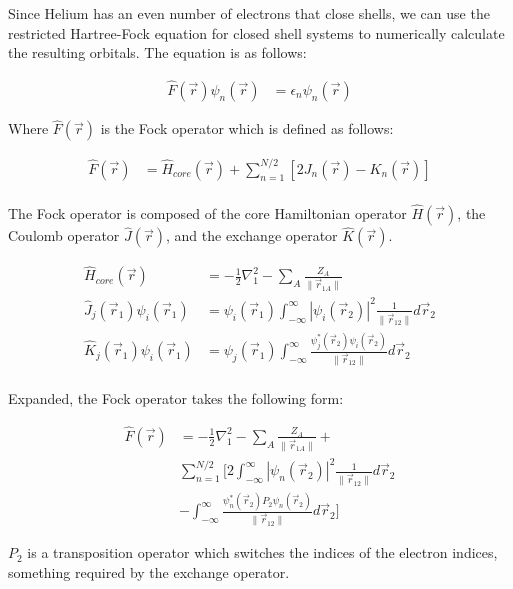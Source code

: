 \documentclass[journal, twoside]{IEEEtran}
\begin{document}
Since Helium has an even number of electrons that close shells, we can use the restricted Hartree-Fock equation for closed shell systems to numerically calculate the resulting orbitals. The equation is as follows:

\begin{align*}
  \hat{F}(\vec{r})\psi_n(\vec{r}) &= \epsilon_n\psi_n(\vec{r})
\end{align*}

Where $\hat{F}(\vec{r})$ is the Fock operator which is defined as follows:

\begin{align*}
  \hat{F}(\vec{r}) &= \hat{H}_{core}(\vec{r}) + \sum_{n=1}^{N/2}\left[2J_n(\vec{r}) - K_n(\vec{r})\right]\\
\end{align*}

The Fock operator is composed of the core Hamiltonian operator $\hat{H}(\vec{r})$, the Coulomb operator $\hat{J}(\vec{r})$, and the exchange operator $\hat{K}(\vec{r})$.

\begin{align*}
  \hat{H}_{core}(\vec{r}) &= -\frac{1}{2}\nabla_1^2 - \sum_A\frac{Z_A}{\|\vec{r}_{1 A}\|}\\
  \hat{J}_j(\vec{r}_1)\psi_i(\vec{r}_1) &= \psi_i(\vec{r}_1)\int_{-\infty}^{\infty}\left|\psi_i(\vec{r}_2)\right|^2\frac{1}{\|\vec{r}_{12}\|}d\vec{r}_2 \\
  \hat{K}_j(\vec{r}_1)\psi_i(\vec{r}_1) &= \psi_j(\vec{r}_1)\int_{-\infty}^{\infty}\frac{\psi_j^\ast(\vec{r}_2)\psi_i(\vec{r}_2)}{\|\vec{r}_{12}\|}d\vec{r}_2 \\
\end{align*}

Expanded, the Fock operator takes the following form:

\begin{align*}
  \hat{F}(\vec{r}) &= -\frac{1}{2}\nabla_1^2 - \sum_A\frac{Z_A}{\|\vec{r}_{1 A}\|} + \\ & \sum_{n=1}^{N/2} \bigg[ 2\int_{-\infty}^{\infty}\left|\psi_n(\vec{r}_2)\right|^2\frac{1}{\|\vec{r}_{12}\|}d\vec{r}_2 \\ & - \int_{-\infty}^{\infty}\frac{\psi_n^\ast(\vec{r}_2)P_2\psi_n(\vec{r}_2)}{\|\vec{r}_{12}\|}d\vec{r}_2 \bigg]
\end{align*}

$P_2$ is a transposition operator which switches the indices of the electron indices, something required by the exchange operator.


\lipsum[1]
\end{document}
